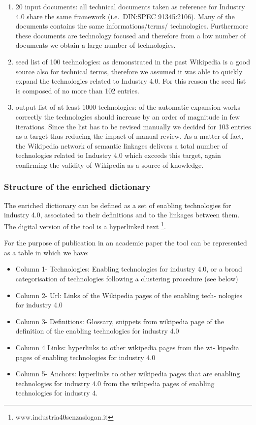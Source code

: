 \documentclass[]{book}
\providecommand{\tightlist}{%
  \setlength{\itemsep}{0pt}\setlength{\parskip}{0pt}}
\let\rmarkdownfootnote\footnote%
\def\footnote{\protect\rmarkdownfootnote}
\begin{document}
\begin{enumerate}
\def\labelenumi{\arabic{enumi}.}
\item
  20 input documents: all technical documents taken as reference for
  Industry 4.0 share the same framework (i.e.~DIN:SPEC 91345:2106). Many
  of the documents contains the same informations/terms/ technologies.
  Furthermore these documents are technology focused and therefore from
  a low number of documents we obtain a large number of technologies.
\item
  seed list of 100 technologies: as demonstrated in the past Wikipedia
  is a good source also for technical terms, therefore we assumed it was
  able to quickly expand the technologies related to Industry 4.0. For
  this reason the seed list is composed of no more than 102 entries.
\item
  output list of at least 1000 technologies: of the automatic expansion
  works correctly the technologies should increase by an order of
  magnitude in few iterations. Since the list has to be revised manually
  we decided for 103 entries as a target thus reducing the impact of
  manual review. As a matter of fact, the Wikipedia network of semantic
  linkages delivers a total number of technologies related to Industry
  4.0 which exceeds this target, again confirming the validity of
  Wikipedia as a source of knowledge.
\end{enumerate}

\subsubsection*{Structure of the enriched
dictionary}\label{structure-of-the-enriched-dictionary}

The enriched dictionary can be defined as a set of enabling technologies
for industry 4.0, associated to their definitions and to the linkages
between them. The digital version of the tool is a hyperlinked text
\footnote{www.industria40senzaslogan.it}.

For the purpose of publication in an academic paper the tool can be
represented as a table in which we have:

\begin{itemize}
\tightlist
\item
  Column 1- Technologies: Enabling technologies for industry 4.0, or a
  broad categorisation of technologies following a clustering procedure
  (see below)
\item
  Column 2- Url: Links of the Wikipedia pages of the enabling tech-
  nologies for industry 4.0
\item
  Column 3- Definitions: Glossary, snippets from wikipedia page of the
  definition of the enabling technologies for industry 4.0
\item
  Column 4 Links: hyperlinks to other wikipedia pages from the wi-
  kipedia pages of enabling technologies for industry 4.0
\item
  Column 5- Anchors: hyperlinks to other wikipedia pages that are
  enabling technologies for industry 4.0 from the wikipedia pages of
  enabling technologies for industry 4.
\end{itemize}
\end{document}
